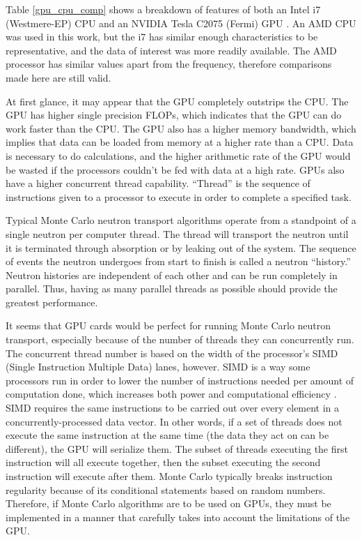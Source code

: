 Table \ref{gpu_cpu_comp} shows a breakdown of features of both an Intel i7 (Westmere-EP) CPU and an NVIDIA Tesla C2075 (Fermi) GPU \cite{cent, cpu_latency}.  An AMD CPU was used in this work, but the i7 has similar enough characteristics to be representative, and the data of interest was more readily available.  The AMD processor has similar values apart from the frequency, therefore comparisons made here are still valid.  

At first glance, it may appear that the GPU completely outstrips the CPU.  The GPU has higher single precision FLOPs, which indicates that the GPU can do work faster than the CPU.  The GPU also has a higher memory bandwidth, which implies that data can be loaded from memory at a higher rate than a CPU.  Data is necessary to do calculations, and the higher arithmetic rate of the GPU would be wasted if the processors couldn't be fed with data at a high rate.  GPUs also have a higher concurrent thread capability.  ``Thread'' is the sequence of instructions given to a processor to execute in order to complete a specified task.  

Typical Monte Carlo neutron transport algorithms operate from a standpoint of a single neutron per computer thread.  The thread will transport the neutron until it is terminated through absorption or by leaking out of the system.  The sequence of events the neutron undergoes from start to finish is called a neutron ``history.''  Neutron histories are independent of each other and can be run completely in parallel.  Thus, having as many parallel threads as possible should provide the greatest performance.  

It seems that GPU cards would be perfect for running Monte Carlo neutron transport, especially because of the number of threads they can concurrently run.  The concurrent thread number is based on the width of the processor's SIMD (Single Instruction Multiple Data) lanes, however.  SIMD is a way some processors run in order to lower the number of instructions needed per amount of computation done, which increases both power and computational efficiency \cite{simd_power}.  SIMD requires the same instructions to be carried out over every element  in a concurrently-processed data vector.  In other words, if a set of threads does not execute the same instruction at the same time (the data they act on can be different), the GPU will serialize them.  The subset of threads executing the first instruction will all execute together, then the subset executing the second instruction will execute after them.  Monte Carlo typically breaks instruction regularity because of its conditional statements based on random numbers.  Therefore, if Monte Carlo algorithms are to be used on GPUs, they must be implemented in a manner that carefully takes into account the limitations of the GPU.

